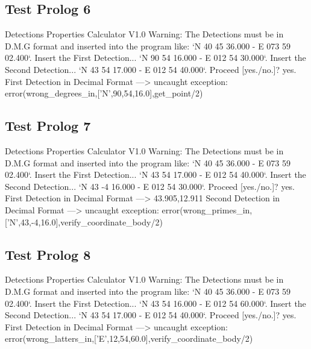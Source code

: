 \documentclass{article}
\begin{document}
\subsection*{Test Prolog 6}
	\begin{spverbatim}
		Detections Properties Calculator V1.0
		Warning: The Detections must be in D.M.G format and inserted into the program like: `N 40 45 36.000 - E 073 59 02.400`.
		Insert the First Detection...
		`N 90 54 16.000 - E 012 54 30.000`.
		Insert the Second Detection...
		`N 43 54 17.000 - E 012 54 40.000`.
		Proceed [yes./no.]?
		yes.
		First Detection in Decimal Format ---> 
		uncaught exception: error(wrong_degrees_in,['N',90,54,16.0],get_point/2)
	\end{spverbatim}

\subsection*{Test Prolog 7}
	\begin{spverbatim}
		Detections Properties Calculator V1.0
		Warning: The Detections must be in D.M.G format and inserted into the program like: `N 40 45 36.000 - E 073 59 02.400`.
		Insert the First Detection...
		`N 43 54 17.000 - E 012 54 40.000`.
		Insert the Second Detection...
		`N 43 -4 16.000 - E 012 54 30.000`.
		Proceed [yes./no.]?
		yes.
		First Detection in Decimal Format ---> 43.905,12.911
		Second Detection in Decimal Format ---> 
		uncaught exception: error(wrong_primes_in,['N',43,-4,16.0],verify_coordinate_body/2)
	\end{spverbatim}

\subsection*{Test Prolog 8}
	\begin{spverbatim}
		Detections Properties Calculator V1.0
		Warning: The Detections must be in D.M.G format and inserted into the program like: `N 40 45 36.000 - E 073 59 02.400`.
		Insert the First Detection...
		`N 43 54 16.000 - E 012 54 60.000`.
		Insert the Second Detection...
		`N 43 54 17.000 - E 012 54 40.000`.
		Proceed [yes./no.]?
		yes.
		First Detection in Decimal Format ---> 
		uncaught exception: error(wrong_latters_in,['E',12,54,60.0],verify_coordinate_body/2)
	\end{spverbatim}
\end{document}
